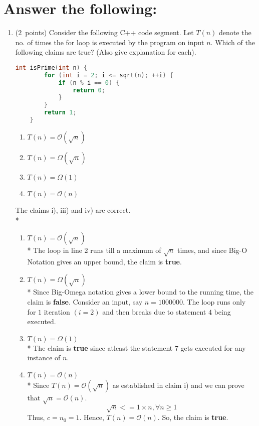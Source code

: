 \documentclass[14pt]{article}
\begin{document}
\section{Answer the following:}
\begin{enumerate}[label=\alph*)]
    \item ($2$\ points)
    Consider the following C++ code segment. Let $T(n)$ denote the no. of times the for loop is executed by the program on input $n$. Which of the following claims are true? (Also give explanation for each).
    \begin{lstlisting}[language=C++, title={Part (a)}]
    int isPrime(int n) {
        for (int i = 2; i <= sqrt(n); ++i) {
            if (n % i == 0) {
                return 0;
            }
        }
        return 1;
    }
    \end{lstlisting}
    \begin{enumerate}[label=\roman*]
        \item $T(n) = \mathcal{O}(\sqrt{n})$
        \item $T(n) = \Omega(\sqrt{n})$
        \item $T(n) = \Omega(1)$
        \item $T(n) = \mathcal{O}(n)$
    \end{enumerate}
    \begin{myframe}[width=500pt,height=340pt,top=2pt,bottom=2.5pt,left=2pt,right=2pt,arc=10pt,auto outer arc]
    The claims i), iii) and iv) are correct. \\*
    \begin{enumerate}[label=\roman*]
        \item $T(n) = \mathcal{O}(\sqrt{n})$ \\*
        The loop in line 2 runs till a maximum of $\sqrt{n}$ times, and since Big-O Notation gives an upper bound, the claim is \textbf{true}.
        \item $T(n) = \Omega(\sqrt{n})$ \\*
        Since Big-Omega notation gives a lower bound to the running time, the claim is \textbf{false}. Consider an input, say $n = 1000000$. The loop runs only for $1$ iteration $(i = 2)$ and then breaks due to statement $4$ being executed.
        \item $T(n) = \Omega(1)$ \\*
        The claim is \textbf{true} since atleast the statement $7$ gets executed for any instance of $n$.
        \item $T(n) = \mathcal{O}(n)$ \\*
        Since $T(n) = \mathcal{O}(\sqrt{n})$ as established in claim i) and we can prove that $\sqrt n = \mathcal{O}(n)$.
        \[ \sqrt{n} <= 1\times n, \forall n \geq 1\]
        Thus, $c = n_{0} = 1$. Hence, $T(n) = \mathcal{O}(n)$. So, the claim is \textbf{true}.
        

\end{enumerate}
\end{myframe}
\end{enumerate}
\end{document}
